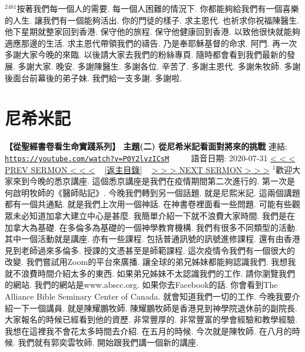 \documentclass{book}
\begin{document}
$^{2481}$按著我們每一個人的需要.
每一個人困難的情況下.
你都能夠給我們有一個喜樂的人生.
讓我們有一個能夠活出.
你的門徒的樣子.
求主恩代.
也祈求你祝福陳醫生.
他下星期就整家回到香港.
保守他的旅程.
保守他健康回到香港.
以致他很快就能夠適應那邊的生活.
求主恩代帶領我們的禱告.
乃是奉耶穌基督的命求.
阿門.
再一次多謝大家今晚的來臨.
以後請大家去我們的粉絲專頁.
隨時都會看到我們最新的發展.
多謝大家.
晚安.
多謝陳醫生.
多謝各位.
辛苦了.
多謝主恩代.
多謝朱牧師.
多謝後面台前幕後的弟子妹.
我們給一支多謝.
多謝啦.
\newpage



\section{尼希米記}
\label{sec:P0Y2lvzICsM}
\textbf{【從聖經書卷看生命實踐系列】 主題(二) 從尼希米記看面對將來的挑戰}
\newline
\newline
連結: \href{https://youtube.com/watch?v=P0Y2lvzICsM}{\texttt{https://youtube.com/watch?v=P0Y2lvzICsM}} ~~~~ 語音日期: 2020-07-31
\newline
\newline
\hyperref[sec:yb30yQHiYdM]{\small{< < < PREV SERMON < < <}}
~
\hyperref[sec:index]{\small{[返主目錄]}}
~
\hyperref[sec:XLKUZGl9ItY]{\small{> > > NEXT SERMON > > >}}
\newline
\newline
$^{1}$歡迎大家來到今晚的悉京講座.
這個悉京講座是我們在疫情期間第二次進行的.
第一次是何啟明牧師的《醫師貼記》.
今晚我們轉到另一個話題.
就是尼熙米記.
這兩個講題都有一個共通點.
就是我們上次用一個神話.
在神書卷裡面看一些問題.
可能有些觀眾未必知道加拿大建立中心是甚麼.
我簡單介紹一下就不浪費大家時間.
我們是在加拿大為基礎.
在多倫多為基礎的一個神學教育機構.
我們有很多不同類型的活動.
其中一個活動就是講座.
亦有一些課程.
包括普通訊號的訊號進修課程.
還有由香港見到老師過來多倫多.
授課的文憑甚至是師範課程.
這次疫情令我們有一個很大的改變.
我們嘗試用Zoom的平台來廣播.
讓全球的弟兄姊妹都能夠認識我們.
我想我就不浪費時間介紹太多的東西.
如果弟兄姊妹不太認識我們的工作.
請你瀏覽我們的網站.
我們的網站是www.abscc.org.
如果你去Facebook的話.
你會看到The Alliance Bible Seminary Center of Canada.
就會知道我們一切的工作.
今晚我要介紹一下一個講員.
就是陳耀鵬牧師.
陳耀鵬牧師是香港見到神學院退休前的副院長.
大家報名的時候已經看到他的資歷.
非常豐厚的.
非常豐富的學會經驗和教學經驗.
我想在這裡我不會花太多時間去介紹.
在五月的時候.
今次就是陳牧師.
在八月的時候.
我們就有郭奕雲牧師.
開始跟我們講一個新的講座.
\end{document}
